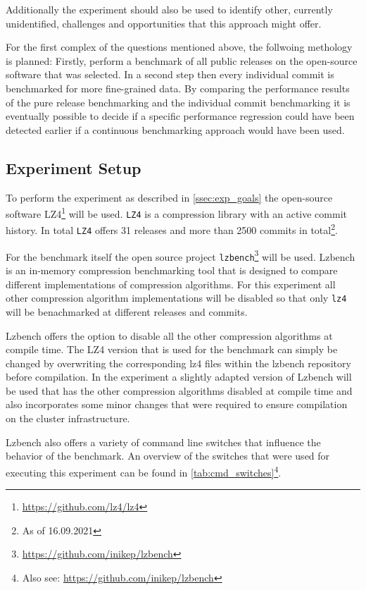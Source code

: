 \documentclass[	runningheads,
				a4paper]{llncs}
\begin{document}
	Additionally the experiment should also be used to identify other, currently unidentified, challenges and opportunities that this approach might offer.

	For the first complex of the questions mentioned above, the follwoing methology is planned: Firstly, perform a benchmark of all public releases on the open-source software that was selected. In a second step then every individual commit is benchmarked for more fine-grained data. By comparing the performance results of the pure release benchmarking and the individual commit benchmarking it is eventually possible to decide if a specific performance regression could have been detected earlier if a continuous benchmarking approach would have been used.

	\subsection{Experiment Setup}
	\label{ssec:exp_setup}
	
	To perform the experiment as described in \autoref{ssec:exp_goals} the open-source software LZ4\footnote{\url{https://github.com/lz4/lz4}} will be used. \texttt{LZ4} is a compression library with an active commit history. In total \texttt{LZ4} offers 31 releases and more than 2500 commits in total\footnote{As of 16.09.2021}. 
	
	For the benchmark itself the open source project \texttt{lzbench}\footnote{\url{https://github.com/inikep/lzbench}} will be used. Lzbench is an in-memory compression benchmarking tool that is designed to compare different implementations of compression algorithms. For this experiment all other compression algorithm implementations will be disabled so that only \texttt{lz4} will be benachmarked at different releases and commits. 
	
	Lzbench offers the option to disable all the other compression algorithms at compile time. The LZ4 version that is used for the benchmark can simply be changed by overwriting the corresponding lz4 files within the lzbench repository before compilation. In the experiment a slightly adapted version of Lzbench will be used that has the other compression algorithms disabled at compile time and also incorporates some minor changes that were required to ensure compilation on the cluster infrastructure.

	Lzbench also offers a variety of command line switches that influence the behavior of the benchmark. An overview of the switches that were used for executing this experiment can be found in \autoref{tab:cmd_switches}\footnote{Also see: \url{https://github.com/inikep/lzbench}}.
\end{document}
